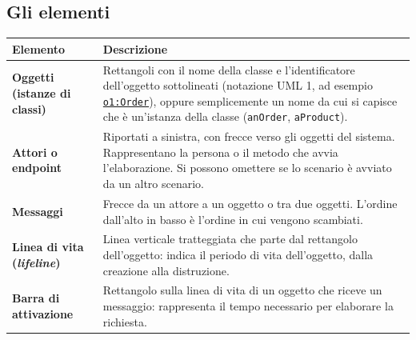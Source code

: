 \subsection{Gli elementi}

\begin{table}[H]
\centering
\renewcommand{\arraystretch}{1.4}
\begin{tabularx}{\textwidth}{>{\bfseries}P{3.2cm} L}
\toprule
Elemento & Descrizione \\
\midrule
Oggetti (istanze di classi) & Rettangoli con il nome della classe e l'identificatore dell'oggetto sottolineati (notazione UML 1,
ad esempio \underline{\texttt{o1:Order}}), oppure semplicemente un nome da cui si capisce che è un'istanza della classe
(\texttt{anOrder}, \texttt{aProduct}). \\
Attori o endpoint & Riportati a sinistra, con frecce verso gli oggetti del sistema. Rappresentano la persona o il metodo che avvia
l'elaborazione. Si possono omettere se lo scenario è avviato da un altro scenario. \\
Messaggi & Frecce da un attore a un oggetto o tra due oggetti. L'ordine dall'alto in basso è l'ordine in cui vengono scambiati. \\
Linea di vita (\textit{lifeline}) & Linea verticale tratteggiata che parte dal rettangolo dell'oggetto: indica il periodo di vita
dell'oggetto, dalla creazione alla distruzione. \\
Barra di attivazione & Rettangolo sulla linea di vita di un oggetto che riceve un messaggio: rappresenta il tempo necessario per
elaborare la richiesta. \\
\bottomrule
\end{tabularx}
\end{table}

\begin{center}
\end{center}

